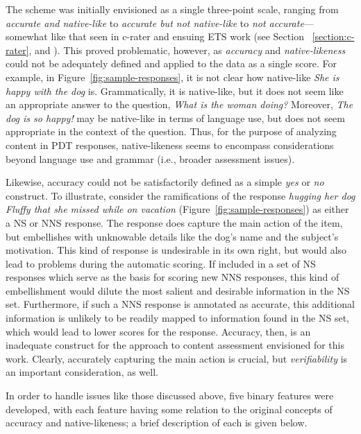 The scheme was initially envisioned as a single three-point scale, ranging from \textit{accurate and native-like} to \textit{accurate but not native-like} to \textit{not accurate}---somewhat like that seen in c-rater and ensuing ETS work (see Section~
\ref{section:c-rater}, and \citealp[][]{leacock:chodorow:03,somasundaran:chodorow:14}).
This proved problematic, however, as \textit{accuracy} and \textit{native-likeness} could not be adequately defined and applied to the data as a single score.
For example, in Figure~\ref{fig:sample-responses}, it is not clear how native-like \textit{She is happy with the dog} is.  Grammatically, it is native-like, but it does not seem like an appropriate answer to the question, \textit{What is the woman doing?} Moreover, \textit{The dog is so happy!} may be native-like in terms of language use, but does not seem appropriate in the context of the question. Thus, for the purpose of analyzing content in PDT responses, native-likeness seems to encompass considerations beyond language use and grammar (i.e., broader assessment issues). 

Likewise, accuracy could not be satisfactorily defined as a simple \textit{yes} or \textit{no} construct. To illustrate, consider the ramifications of the response \textit{hugging her dog Fluffy that she missed while on vacation} (Figure~\ref{fig:sample-responses}) as either a NS or NNS response. The response does capture the main action of the item, but embellishes with unknowable details like the dog's name and the subject's motivation. This kind of response is undesirable in its own right, but would also lead to problems during the automatic scoring. If included in a set of NS responses which serve as the basis for scoring new NNS responses, this kind of embellishment would dilute the most salient and desirable information in the NS set. Furthermore, if such a NNS response is annotated as accurate, this additional information is unlikely to be readily mapped to information found in the NS set, which would lead to lower scores for the response. Accuracy, then, is an inadequate construct for the approach to content assessment envisioned for this work. Clearly, accurately capturing the main action is crucial, but \textit{verifiability} is an important consideration, as well.

In order to handle issues like those discussed above, five binary features were developed, with each feature having some relation to the original concepts of accuracy and native-likeness; a brief description of each is given below. 


